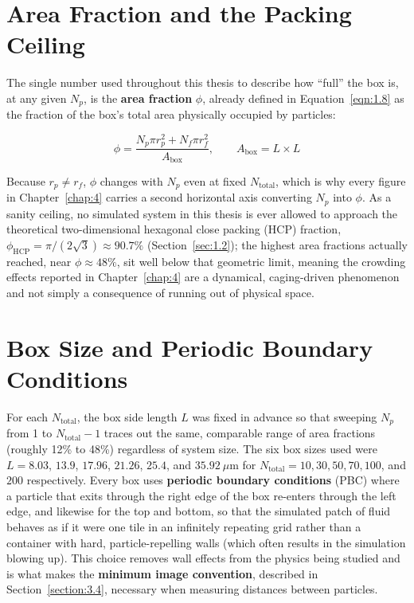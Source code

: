 \section{Area Fraction and the Packing Ceiling}
\label{sec:3.2}
The single number used throughout this thesis to describe how ``full'' the box is, at any given $N_p$, is the \textbf{area fraction} $\phi$, already defined in Equation~\ref{eqn:1.8} as the fraction of the box's total area physically occupied by particles:

\begin{equation}
    \phi = \frac{N_p \pi r_p^2 + N_f \pi r_f^2 }{A_\text{box}}, \qquad A_\text{box} = L \times L
    \label{eq:3.1}
\end{equation}

Because $r_p \neq r_f$, $\phi$ changes with $N_p$ even at fixed $N_\text{total}$, which is why every figure in Chapter~\ref{chap:4} carries a second horizontal axis converting $N_p$ into $\phi$. As a sanity ceiling, no simulated system in this thesis is ever allowed to approach the theoretical two-dimensional hexagonal
close packing (HCP) fraction, $\phi_\text{HCP} = \pi/(2\sqrt{3}) \approx 90.7\%$ (Section~\ref{sec:1.2}); the highest area fractions actually reached, near $\phi \approx 48\%$, sit well below that geometric limit, meaning the crowding effects reported in Chapter~\ref{chap:4} are a dynamical, caging-driven phenomenon and not simply a consequence of running out of physical space.

\section{Box Size and Periodic Boundary Conditions}
\label{sec:3.3}
For each $N_\text{total}$, the box side length $L$ was fixed in advance so that sweeping $N_p$ from 1 to $N_\text{total}-1$ traces out the same, comparable range of area fractions (roughly 12\% to 48\%) regardless of system size. The six box sizes used were $L = 8.03$, $13.9$, $17.96$, $21.26$, $25.4$, and $35.92~\mu\text{m}$ for $N_\text{total} = 10, 30, 50, 70, 100$, and $200$ respectively. Every box uses \textbf{periodic boundary conditions} (PBC) where a particle that exits through the right edge of the box re-enters through the left edge, and likewise for the top and bottom, so that the simulated patch of fluid behaves as if it were one tile in an infinitely repeating grid rather than a container with hard, particle-repelling walls (which often results in the simulation blowing up). This choice removes wall effects from the physics being studied and is what makes the \textbf{minimum image convention}, described in Section~\ref{section:3.4}, necessary when measuring distances between particles.

